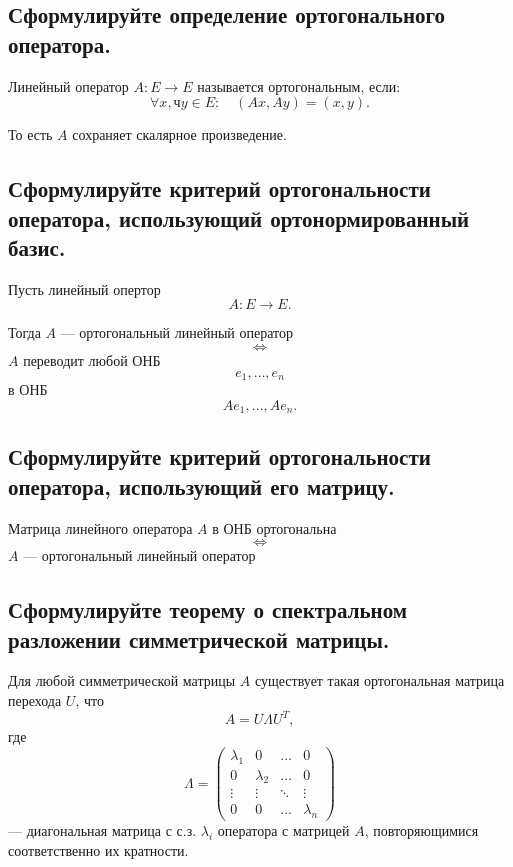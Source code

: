 \subsection{Сформулируйте определение ортогонального оператора.}

\begin{definition}
    Линейный оператор $A: E \to E$ называется ортогональным, если:
    \[
        \forall x, чy \in E:\quad (Ax, Ay) = (x, y).
    \]
    
    То есть $A$ сохраняет скалярное произведение.
\end{definition}
\subsection{Сформулируйте критерий ортогональности оператора, использующий ортонормированный базис.}

\begin{theorem}
    Пусть линейный опертор
    \[
        A: E \to E.
    \]
    
    Тогда $A$ --- ортогональный линейный оператор
    \[
        \Longleftrightarrow
    \]
    $A$ переводит любой ОНБ
    \[
        e_1,\ldots,e_n
    \]
    в ОНБ
    \[
        Ae_1,\ldots,Ae_n.
    \]
\end{theorem}
\subsection{Сформулируйте критерий ортогональности оператора, использующий его матрицу.}

\begin{theorem}
    Матрица линейного оператора $A$ в ОНБ ортогональна
    \[
        \Longleftrightarrow
    \]
    $A$ --- ортогональный линейный оператор
\end{theorem}
\subsection{Сформулируйте теорему о спектральном разложении симметрической матрицы.}

\begin{theorem}
    Для любой симметрической матрицы $A$ существует такая ортогональная матрица перехода $U$, что
    \[
        A = U \Lambda U^T,
    \]
    где
    \[
        \Lambda =
        \begin{pmatrix}
            \lambda_1 & 0 & \ldots & 0 \\
            0 & \lambda_2 & \ldots & 0 \\
            \vdots & \vdots & \ddots & \vdots \\
            0 & 0 & \ldots & \lambda_n
        \end{pmatrix}
    \]
    --- диагональная матрица с с.з. $\lambda_i$ оператора с матрицей $A$,
    повторяющимися соответственно их кратности.
\end{theorem}


